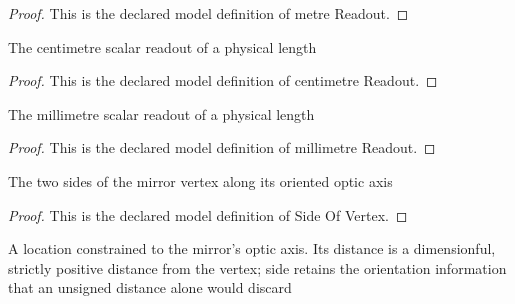 \begin{proof}
  This is the declared model definition of metre Readout.
\end{proof}
\begin{definition}
  \label{def:physics:phyx-mini-0113:phyxminiproblems-problemphyxmini0113-centimetrereadout}
  The centimetre scalar readout of a physical length
\end{definition}
\begin{proof}
  This is the declared model definition of centimetre Readout.
\end{proof}
\begin{definition}
  \label{def:physics:phyx-mini-0113:phyxminiproblems-problemphyxmini0113-millimetrereadout}
  The millimetre scalar readout of a physical length
\end{definition}
\begin{proof}
  This is the declared model definition of millimetre Readout.
\end{proof}
\begin{definition}
  \label{def:physics:phyx-mini-0113:phyxminiproblems-problemphyxmini0113-sideofvertex}
  The two sides of the mirror vertex along its oriented optic axis
\end{definition}
\begin{proof}
  This is the declared model definition of Side Of Vertex.
\end{proof}
\begin{definition}
  \label{def:physics:phyx-mini-0113:phyxminiproblems-problemphyxmini0113-axiallocation}
  A location constrained to the mirror's optic axis. Its distance is a dimensionful, strictly positive distance from the vertex; side retains the orientation information that an unsigned distance alone would discard
\end{definition}
